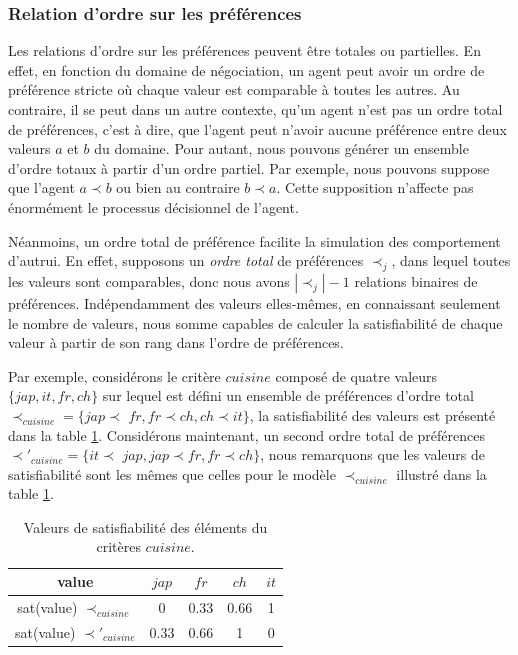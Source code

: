 \subsubsection{Relation d'ordre sur les préférences}
	Les relations d'ordre sur les préférences peuvent être totales ou partielles. En effet, en fonction du domaine de négociation, un agent peut avoir un ordre de préférence stricte où chaque valeur est comparable à toutes les autres. Au contraire, il se peut dans un autre contexte, qu'un agent n'est pas un ordre total de préférences, c'est à dire, que l'agent peut n'avoir aucune préférence entre deux valeurs $a$ et $b$ du domaine. Pour autant, nous pouvons générer un ensemble d'ordre totaux à partir d'un ordre partiel. Par exemple, nous pouvons suppose que l'agent $a \prec b$ ou bien au contraire $b \prec a$. Cette supposition n'affecte pas énormément le processus décisionnel de l'agent. 
	
	Néanmoins, un ordre total de préférence facilite la simulation des comportement d'autrui. En effet, supposons un \textit{ordre total} de préférences $\prec_j$, dans lequel toutes les valeurs sont comparables, donc nous avons $|\prec_j| -1$ relations binaires de préférences. Indépendamment des valeurs elles-mêmes, en connaissant seulement le nombre de valeurs, nous somme capables de calculer la satisfiabilité de chaque valeur à partir de son rang dans l'ordre de préférences.

	Par exemple, considérons le critère $cuisine$ composé de quatre valeurs $\{jap,it,fr,ch\}$ sur lequel est défini un ensemble de préférences d'ordre total $\prec_{cuisine} = \{jap$$\prec$ $fr, fr$$\prec$$ ch, ch$$\prec$$it\}$, la satisfiabilité des valeurs est présenté dans la table \ref{tab:ex2_sat}. Considérons maintenant, un second ordre total de préférences $\prec'_{cuisine} = \{it$$\prec$ $jap, jap$$\prec$$ fr, fr$$\prec$$ch\}$, nous remarquons que les valeurs de satisfiabilité sont les mêmes que celles pour le modèle $\prec_{cuisine}$ illustré dans la table \ref{tab:ex2_sat}. 


	\begin{table} [h]
		\centering
		\caption{Valeurs de satisfiabilité des éléments du critères $cuisine$.}
		\begin{tabular}{ |c|c|c|c|c| }
			\hline
			value & $jap$ & $fr$ & $ch$ & $it$ \\	
			\hline
			sat(value) $\prec_{cuisine}$ & 0 & 0.33 & 0.66 & 1 \\
			\hline
			sat(value) $\prec'_{cuisine}$ & 0.33 & 0.66 & 1 & 0 \\
			\hline
		\end{tabular}
		
		\label{tab:ex2_sat}
		
	\end{table}
	
